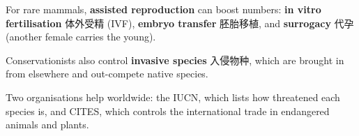\documentclass[11pt]{article}
\begin{document}
For rare mammals, \textbf{assisted reproduction} can boost numbers: \textbf{in vitro fertilisation} 体外受精 (IVF), \textbf{embryo transfer} 胚胎移植, and \textbf{surrogacy} 代孕 (another female carries the young).

Conservationists also control \textbf{invasive species} 入侵物种, which are brought in from elsewhere and out-compete native species.

Two organisations help worldwide: the IUCN, which lists how threatened each species is, and CITES, which controls the international trade in endangered animals and plants.
\end{document}
